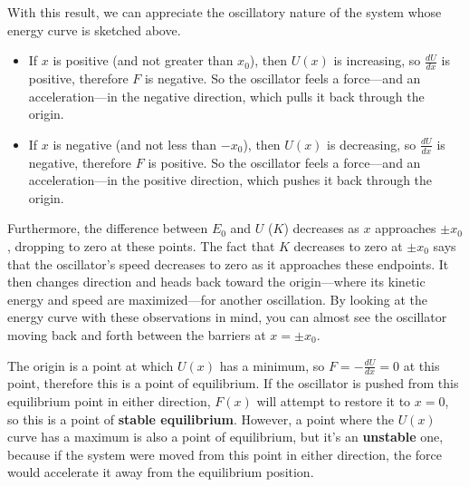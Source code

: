 \documentclass{article}
\begin{document}
\begin{example}
With this result, we can appreciate the oscillatory nature of the system whose energy curve is sketched above.
\begin{itemize}
    \item If $x$ is positive (and not greater than $x_{0}$), then $U(x)$ is increasing, so $\frac{dU}{dx}$ is positive, therefore $F$ is negative. 
    So the oscillator feels a force---and an acceleration---in the negative direction, which pulls it back through the origin.
    \item If $x$ is negative (and not less than $-x_{0}$), then $U(x)$ is decreasing, so $\frac{dU}{dx}$ is negative, therefore $F$ is positive.
    So the oscillator feels a force---and an acceleration---in the positive direction, which pushes it back through the origin.
\end{itemize}

Furthermore, the difference between $E_{0}$ and $U$ ($K$) decreases as $x$ approaches $\pm x_{0}$, dropping to zero at these points.
The fact that $K$ decreases to zero at $\pm x_{0}$ says that the oscillator's speed decreases to zero as it approaches these endpoints.
It then changes direction and heads back toward the origin---where its kinetic energy and speed are maximized---for another oscillation.
By looking at the energy curve with these observations in mind, you can almost see the oscillator moving back and forth between the barriers at $x = \pm x_{0}$.

The origin is a point at which $U(x)$ has a minimum, so $F = -\frac{dU}{dx} = 0$ at this point, therefore this is a point of equilibrium.
If the oscillator is pushed from this equilibrium point in either direction, $F(x)$ will attempt to restore it to $x=0$, so this is a point of \textbf{stable equilibrium}.
However, a point where the $U(x)$ curve has a maximum is also a point of equilibrium, but it's an \textbf{unstable} one, because if the system were moved from this point in either direction, the force would accelerate it away from the equilibrium position.
\end{example}
\end{document}
